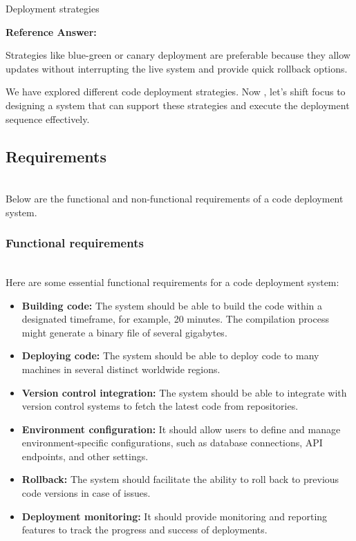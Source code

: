 Deployment strategies

\textbf{Reference Answer:}

Strategies like blue-green or canary deployment are preferable because they allow updates without interrupting the live system and provide quick rollback options.

We have explored different code deployment strategies. Now , let's shift focus to designing a system that can support these strategies and execute the deployment sequence effectively.

\subsection{Requirements}\label{OX1aTHpDnMTVIq-FP2jEy}
\\
Below are the functional and non-functional requirements of a code deployment system.

\subsubsection{Functional requirements}\label{51OqBzNDLQLHuBIIjzZPT}
\\
Here are some essential functional requirements for a code deployment system:

\begin{itemize}
\item
\protect{}\label{xKq5-ugV19yVi4NlCFL3s}
\textbf{Building code:} The system should be able to build the code within a designated timeframe, for example, 20 minutes. The compilation process might generate a binary file of several gigabytes.
\item
\protect{}\label{ZzK2BpGxvD9cPGA4ZFV7y}
\textbf{Deploying code:} The system should be able to deploy code to many machines in several distinct worldwide regions.
\item
\protect{}\label{FMepc4G1LH_7nF2NGqs-l}
\textbf{Version control integration:} The system should be able to integrate with version control systems to fetch the latest code from repositories.
\item
\protect{}\label{Sx-cCGKfmaIedbnjBs2c-}
\textbf{Environment configuration:} It should allow users to define and manage environment-specific configurations, such as database connections, API endpoints, and other settings.
\item
\protect{}\label{-IV5vaxvs2sAM0xz4Rf7R}
\textbf{Rollback:} The system should facilitate the ability to roll back to previous code versions in case of issues.
\item
\protect{}\label{u1sq6AEJyv74v2tREje0c}
\textbf{Deployment monitoring:} It should provide monitoring and reporting features to track the progress and success of deployments.
\end{itemize}

